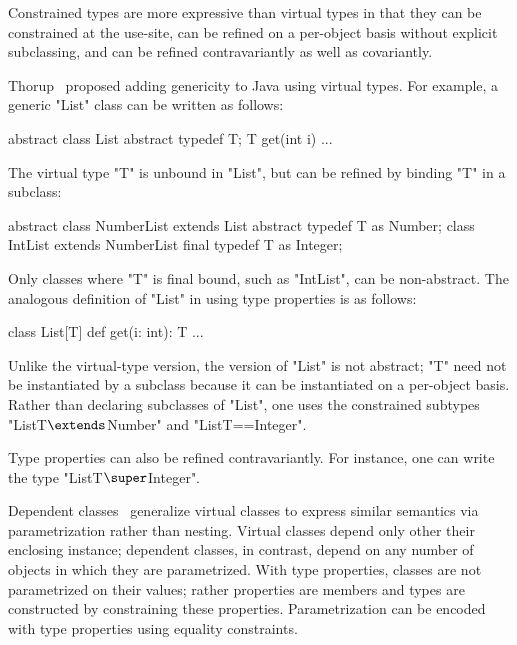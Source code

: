 
Constrained types are more expressive than virtual
types in that they can be constrained at the use-site,
can be refined on a per-object basis without explicit subclassing,
and can be refined contravariantly as well as covariantly.

Thorup~\cite{thorup97}
proposed adding genericity to Java using virtual types.  For example,
a generic \xcd"List" class can be written as follows:
{
\begin{xten}
abstract class List {
  abstract typedef T;
  T get(int i) { ... }
}
\end{xten}}
\noindent
The virtual type \xcd"T" is unbound in \xcd"List", but 
can be refined by binding \xcd"T" in a subclass:
{
\begin{xten}
abstract class NumberList extends List {
  abstract typedef T as Number;
}
class IntList extends NumberList {
  final typedef T as Integer;
}
\end{xten}}
\noindent
Only classes where \xcd"T" is final bound, such as \xcd"IntList",
can be non-abstract.
%
The analogous definition of 
\xcd"List" in \Xten{} using type properties is as follows:
{
\begin{xten}
class List[T] {
  def get(i: int): T { ... }
}
\end{xten}}

\noindent
Unlike the virtual-type version,
the \Xten{} version of \xcd"List" is not abstract;
\xcd"T" need not be instantiated by a subclass because it can be
instantiated on a per-object basis.
Rather than declaring subclasses of \xcd"List",
one uses the constrained subtypes
\xcdmath"List{T$\extends$Number}" and \xcd"List{T==Integer}".

Type properties can also be refined contravariantly.
For instance, one can write the type \xcdmath"List{T$\super$Integer}".

Dependent classes~\cite{dependent-classes} generalize virtual
classes to express similar semantics via parametrization rather
than nesting.  Virtual classes depend only other their enclosing
instance; dependent classes, in contrast, depend on any number
of objects in which they are parametrized.  With type
properties, classes are not parametrized on their values;
rather properties are members and types are constructed by
constraining these properties.  Parametrization can be 
encoded with type properties using equality constraints.


